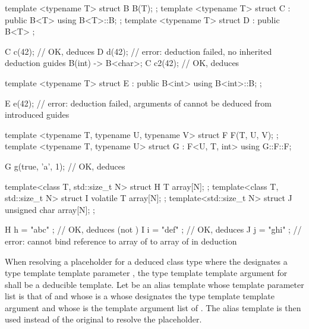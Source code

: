 \pnum
\begin{example}
\begin{codeblock}
template <typename T> struct B {
  B(T);
};
template <typename T> struct C : public B<T> {
  using B<T>::B;
};
template <typename T> struct D : public B<T> {};

C c(42);            // OK, deduces 
D d(42);            // error: deduction failed, no inherited deduction guides
B(int) -> B<char>;
C c2(42);           // OK, deduces 

template <typename T> struct E : public B<int> {
  using B<int>::B;
};

E e(42);            // error: deduction failed, arguments of  cannot be deduced from introduced guides

template <typename T, typename U, typename V> struct F {
  F(T, U, V);
};
template <typename T, typename U> struct G : F<U, T, int> {
  using G::F::F;
}

G g(true, 'a', 1);  // OK, deduces 

template<class T, std::size_t N>
struct H {
  T array[N];
};
template<class T, std::size_t N>
struct I {
  volatile T array[N];
};
template<std::size_t N>
struct J {
  unsigned char array[N];
};

H h = { "abc" };    // OK, deduces  (not )
I i = { "def" };    // OK, deduces 
J j = { "ghi" };    // error: cannot bind reference to array of  to array of  in deduction
\end{codeblock}
\end{example}

\pnum
When resolving a placeholder for a deduced class type
where the 
designates a type template template parameter ,
the type template template argument for 
shall be a deducible template.
Let  be an alias template
whose template parameter list is that of  and
whose  is a 
whose  designates the type template template argument and
whose  is the template argument list of .
The alias template  is then used
instead of the original 
to resolve the placeholder.

